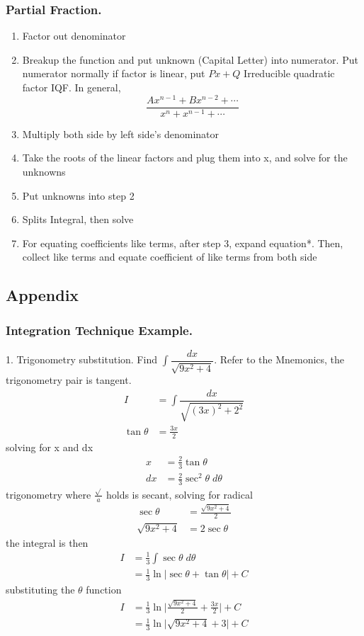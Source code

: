 \documentclass[../main.tex]{subfiles}
\begin{document}
\subsubsection*{Partial Fraction. }
\begin{enumerate}
    \item Factor out denominator
    \item Breakup the function and put unknown (Capital Letter) into numerator. Put numerator normally if factor is linear, put $Px+Q$ Irreducible quadratic factor IQF. In general, \begin{equation*}
        \frac{Ax^{n-1}+Bx^{n-2}+\cdots}{x^{n}+x^{n-1}+\cdots}
    \end{equation*}
    \item Multiply both side by left side's denominator
    \item Take the roots of the linear factors and plug them into x, and solve for the unknowns
    \item Put unknowns into step 2
    \item Splits Integral, then solve
    \item For equating coefficients like terms, after step 3, expand equation*. Then, collect like terms and equate coefficient of like terms from both side
\end{enumerate}
\clearpage

\subsection*{Appendix} 
\subsubsection*{Integration Technique Example.}

1. Trigonometry substitution. Find $\int \dfrac{dx}{\sqrt{9x^2+4}}$. Refer to the Mnemonics, the trigonometry pair is tangent.
\begin{align*}
    I&=\int \dfrac{dx}{\sqrt{(3x)^2+2^2}}\\
    \tan\theta&=\frac{3x}{2}
\end{align*}
solving for x and dx
\begin{align*}
    x&=\frac{2}{3}\tan\theta\\
    dx&=\frac{2}{3}\sec^2\theta \;d\theta
\end{align*}
trigonometry where $\frac{\sqrt{}}{a}$ holds is secant, solving for radical
\begin{align*}
    \sec \theta&=\frac{\sqrt{9x^2+4}}{2}\\
    \sqrt{9x^2+4}&=2\sec\theta
\end{align*}
the integral is then
\begin{align*}
    I&=\frac{1}{3}\int \sec\theta \;d\theta\\
    &=\frac{1}{3}\ln |\sec\theta+\tan\theta|+C
\end{align*}
substituting the $\theta$ function
\begin{align*}
    I&=\frac{1}{3}\ln \bigg|\frac{\sqrt{9x^2+4}}{2}+\frac{3x}{2}\bigg|+C\\
    &=\frac{1}{3} \ln \bigg | \sqrt{9x^2+4} +3 \bigg|+C
\end{align*}
\end{document}
